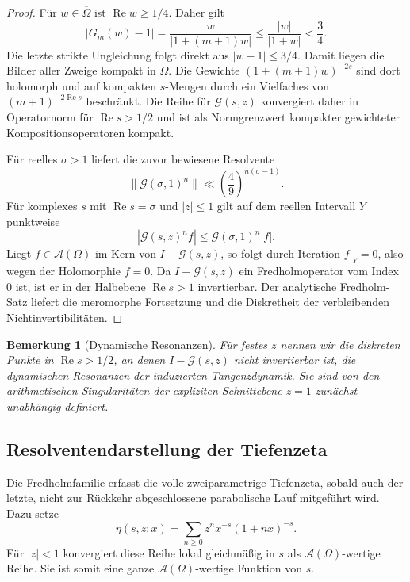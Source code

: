 \documentclass[11pt,a4paper]{article}
\newtheorem{remark}{Bemerkung}[section]
\begin{document}
\begin{proof}
Für $w\in\overline\Omega$ ist $\operatorname{Re}w\ge1/4$. Daher
gilt
\[
 |G_m(w)-1|
 =\frac{|w|}{|1+(m+1)w|}
 \le\frac{|w|}{|1+w|}
 <\frac34.
\]
Die letzte strikte Ungleichung folgt direkt aus
$|w-1|\le3/4$. Damit liegen die Bilder aller Zweige kompakt in
$\Omega$. Die Gewichte
$(1+(m+1)w)^{-2s}$ sind dort holomorph und auf kompakten
$s$-Mengen durch ein Vielfaches von
$(m+1)^{-2\operatorname{Re}s}$ beschränkt. Die Reihe für
$\mathcal G(s,z)$ konvergiert daher in Operatornorm für
$\operatorname{Re}s>1/2$ und ist als Normgrenzwert kompakter
gewichteter Kompositionsoperatoren kompakt.

Für reelles $\sigma>1$ liefert die zuvor bewiesene Resolvente
\[
 \|\mathcal G(\sigma,1)^n\|\ll
 \left(\frac49\right)^{n(\sigma-1)}.
\]
Für komplexes $s$ mit $\operatorname{Re}s=\sigma$ und $|z|\le1$
gilt auf dem reellen Intervall $Y$ punktweise
\[
 |\mathcal G(s,z)^nf|
 \le\mathcal G(\sigma,1)^n|f|.
\]
Liegt $f\in\mathcal A(\Omega)$ im Kern von
$I-\mathcal G(s,z)$, so folgt durch Iteration $f|_Y=0$, also wegen
der Holomorphie $f=0$. Da $I-\mathcal G(s,z)$ ein Fredholmoperator
vom Index $0$ ist, ist er in der Halbebene
$\operatorname{Re}s>1$ invertierbar. Der analytische Fredholm-Satz
liefert die meromorphe Fortsetzung und die Diskretheit der verbleibenden
Nichtinvertibilitäten.
\end{proof}

\begin{remark}[Dynamische Resonanzen]
Für festes $z$ nennen wir die diskreten Punkte in
$\operatorname{Re}s>1/2$, an denen
$I-\mathcal G(s,z)$ nicht invertierbar ist, die dynamischen
Resonanzen der induzierten Tangenzdynamik. Sie sind von den
arithmetischen Singularitäten der expliziten Schnittebene $z=1$
zunächst unabhängig definiert.
\end{remark}


\subsection{Resolventendarstellung der Tiefenzeta}

Die Fredholmfamilie erfasst die volle zweiparametrige Tiefenzeta, sobald
auch der letzte, nicht zur Rückkehr abgeschlossene parabolische Lauf
mitgeführt wird. Dazu setze
\[
 \eta(s,z;x)
 =
 \sum_{n\ge0}z^n x^{-s}(1+nx)^{-s}.
\]
Für $|z|<1$ konvergiert diese Reihe lokal gleichmäßig in $s$ als
$\mathcal A(\Omega)$-wertige Reihe. Sie ist somit eine ganze
$\mathcal A(\Omega)$-wertige Funktion von $s$.
\end{document}
